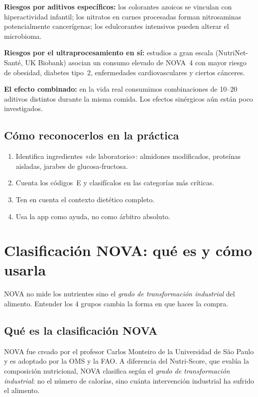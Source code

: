 \documentclass[a5paper,12pt,oneside,openany]{book}
\begin{document}
\textbf{Riesgos por aditivos específicos:} los colorantes azoicos se vinculan
con hiperactividad infantil; los nitratos en carnes procesadas forman
nitrosaminas potencialmente cancerígenas; los edulcorantes intensivos pueden
alterar el microbioma.

\textbf{Riesgos por el ultraprocesamiento en sí:} estudios a gran escala
(NutriNet-Santé, UK Biobank) asocian un consumo elevado de NOVA~4 con mayor
riesgo de obesidad, diabetes tipo~2, enfermedades cardiovasculares y ciertos
cánceres.

\textbf{El efecto combinado:} en la vida real consumimos combinaciones de
10--20 aditivos distintos durante la misma comida. Los efectos sinérgicos
aún están poco investigados.

\section{Cómo reconocerlos en la práctica}

\begin{enumerate}
  \item Identifica ingredientes «de laboratorio»: almidones modificados,
    proteínas aisladas, jarabes de glucosa-fructosa.
  \item Cuenta los códigos~E y clasifícalos en las categorías más críticas.
  \item Ten en cuenta el contexto dietético completo.
  \item Usa la app como ayuda, no como árbitro absoluto.
\end{enumerate}

\chapter{Clasificación NOVA: qué es y cómo usarla}

NOVA no mide los nutrientes sino el \emph{grado de transformación industrial}
del alimento. Entender los 4 grupos cambia la forma en que haces la compra.

\section{Qué es la clasificación NOVA}

NOVA fue creado por el profesor Carlos Monteiro de la Universidad de São Paulo
y es adoptado por la OMS y la FAO. A diferencia del Nutri-Score, que evalúa la
composición nutricional, NOVA clasifica según el \emph{grado de transformación
industrial}: no el número de calorías, sino cuánta intervención industrial ha
sufrido el alimento.
\end{document}
